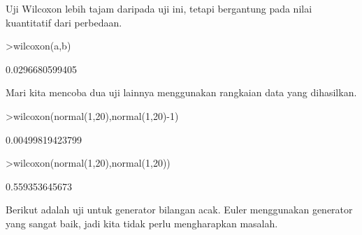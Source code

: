 \documentclass[a4paper,10pt]{article}
\begin{document}
\begin{eulernotebook}
\begin{eulercomment}
\begin{eulercomment}
\begin{eulercomment}
Uji Wilcoxon lebih tajam daripada uji ini, tetapi bergantung pada
nilai kuantitatif dari perbedaan.
\end{eulercomment}
\begin{eulerprompt}
>wilcoxon(a,b)
\end{eulerprompt}
\begin{euleroutput}
  0.0296680599405
\end{euleroutput}
\begin{eulercomment}
Mari kita mencoba dua uji lainnya menggunakan rangkaian data yang
dihasilkan.
\end{eulercomment}
\begin{eulerprompt}
>wilcoxon(normal(1,20),normal(1,20)-1)
\end{eulerprompt}
\begin{euleroutput}
  0.00499819423799
\end{euleroutput}
\begin{eulerprompt}
>wilcoxon(normal(1,20),normal(1,20))
\end{eulerprompt}
\begin{euleroutput}
  0.559353645673
\end{euleroutput}
\begin{eulercomment}
Berikut adalah uji untuk generator bilangan acak. Euler menggunakan
generator yang sangat baik, jadi kita tidak perlu mengharapkan
masalah.


\end{eulercomment}
\end{eulercomment}
\end{eulercomment}
\end{eulernotebook}
\end{document}
